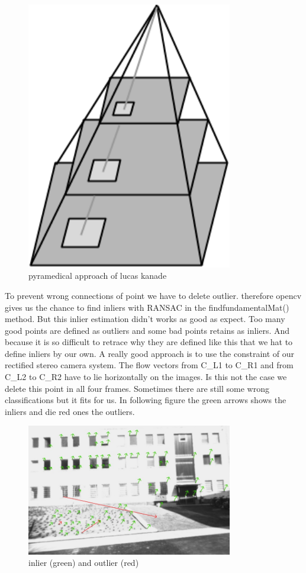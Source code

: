 \documentclass[11pt]{article}
\begin{document}
	\begin{figure}[ht!]
		\centering
		\includegraphics[width=90mm]{images/pyramidical.png}
		\caption{pyramedical approach of lucas kanade \label{overflow}}
	\end{figure}
	
	To prevent wrong connections of point we have to delete outlier. therefore opencv gives us the chance to find inliers with RANSAC in the findfundamentalMat() method. But this inlier estimation didn’t works as good as expect. Too many good points are defined as outliers and some bad points retains as inliers. And because it is so difficult to retrace why they are defined like this that we hat to define inliers by our own. A really good approach is to use the constraint of our rectified stereo camera system. The flow vectors from C\_L1 to C\_R1 and from C\_L2 to C\_R2 have to lie horizontally on the images. Is this not the case we delete this point in all four frames. Sometimes there are still some wrong classifications but it fits for us.
	In following figure the green arrows shows the inliers and die red ones the outliers.
	
	\begin{figure}[ht!]
		\centering
		\includegraphics[width=90mm]{images/inlier_outlier3.jpg}
		\caption{inlier (green) and outlier (red) \label{overflow}}
	\end{figure}
	
\end{document}
